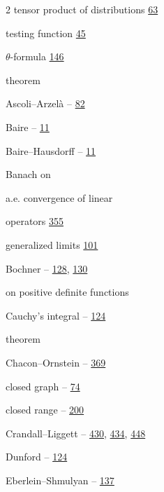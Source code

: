 \begin{multicols}{2}
\noindent tensor product of distributions \hyperlink{page.63}{63}\par
\noindent testing function \hyperlink{page.45}{45}\par
\noindent $\theta $-formula \hyperlink{page.146}{146}\par
\noindent theorem\par
\hspace*{1.1em}Ascoli--Arzelà -- \hyperlink{page.82}{82}\par
\hspace*{1.1em}Baire -- \hyperlink{page.11}{11}\par
\hspace*{1.1em}Baire--Hausdorff -- \hyperlink{page.11}{11}\par
\hspace*{1.1em}Banach on\par
\hspace*{2.2em}a.e. convergence of linear\par
\hspace*{3.3em}operators \hyperlink{page.355}{355}\par
\hspace*{2.2em}generalized limits \hyperlink{page.101}{101}\par
\hspace*{1.1em}Bochner -- \hyperlink{page.128}{128}, \hyperlink{page.130}{130}\par
\hspace*{2.2em}on positive definite functions\par
\hspace*{1.1em}Cauchy's integral -- \hyperlink{page.124}{124}\par
\noindent theorem\par
\hspace*{1.1em}Chacon--Ornstein -- \hyperlink{page.369}{369}\par
\hspace*{1.1em}closed graph -- \hyperlink{page.74}{74}\par
\hspace*{1.1em}closed range -- \hyperlink{page.200}{200}\par
\hspace*{1.1em}Crandall--Liggett -- \hyperlink{page.430}{430}, \hyperlink{page.434}{434}, \hyperlink{page.448}{448}\par
\hspace*{1.1em}Dunford -- \hyperlink{page.124}{124}\par
\hspace*{1.1em}Eberlein--Shmulyan -- \hyperlink{page.137}{137}\par

\end{multicols}
